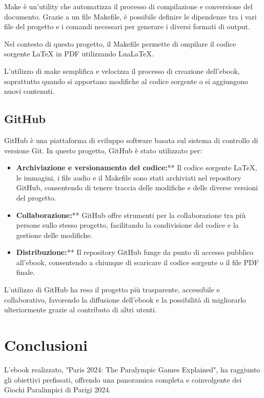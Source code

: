 \documentclass[a4paper,12pt]{report}
\begin{document}
Make è un'utility che automatizza il processo di compilazione e conversione del documento. Grazie a un file Makefile, è possibile definire le dipendenze tra i vari file del progetto e i comandi necessari per generare i diversi formati di output.
					
Nel contesto di questo progetto, il Makefile permette di ompilare il codice sorgente LaTeX in PDF utilizzando LuaLaTeX.
					
L'utilizzo di make semplifica e velocizza il processo di creazione dell'ebook, soprattutto quando si apportano modifiche al codice sorgente o si aggiungono nuovi contenuti.
					
\subsection{GitHub}
					
GitHub è una piattaforma di sviluppo software basata sul sistema di controllo di versione Git. In questo progetto, GitHub è stato utilizzato per:
					
\begin{itemize}
	\item \textbf{Archiviazione e versionamento del codice:}** Il codice sorgente LaTeX, le immagini, i file audio e il Makefile sono stati archiviati nel repository GitHub, consentendo di tenere traccia delle modifiche e delle diverse versioni del progetto.
	\item \textbf{Collaborazione:}** GitHub offre strumenti per la collaborazione tra più persone sullo stesso progetto, facilitando la condivisione del codice e la gestione delle modifiche.
	\item \textbf{Distribuzione:}** Il repository GitHub funge da punto di accesso pubblico all'ebook, consentendo a chiunque di scaricare il codice sorgente o il file PDF finale.
\end{itemize}
						
L'utilizzo di GitHub ha reso il progetto più trasparente, accessibile e collaborativo, favorendo la diffusione dell'ebook e la possibilità di migliorarlo ulteriormente grazie al contributo di altri utenti.
								
\section{Conclusioni}

L'ebook realizzato, "Paris 2024: The Paralympic Games Explained", ha raggiunto gli obiettivi prefissati, offrendo una panoramica completa e coinvolgente dei Giochi Paralimpici di Parigi 2024.
\end{document}
